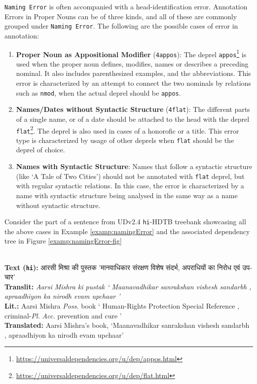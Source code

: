 \texttt{Naming Error} is often accompanied with a head-identification error. Annotation Errors in Proper Nouns can be of three kinds, and all of these are commonly grouped under \texttt{Naming Error}. The following are the possible cases of error in annotation:

\begin{enumerate}

    \item \textbf{Proper Noun as Appositional Modifier} (\texttt{4appos}): The deprel \texttt{appos}\footnote{\url{https://universaldependencies.org/u/dep/appos.html}} is used when the proper noun defines, modifies, names or describes a preceding nominal. It also includes parenthesized examples, and the abbreviations. This error is characterized by an attempt to connect the two nominals by relations such as \texttt{nmod}, when the actual deprel should be \texttt{appos}.
    
    \item \textbf{Names/Dates without Syntactic Structure} (\texttt{4flat}): The different parts of a single name, or of a date should be attached to the head with the deprel \texttt{flat}\footnote{\url{https://universaldependencies.org/u/dep/flat.html}}. The deprel is also used in cases of a honorofic or a title. This error type is characterized by usage of other deprels when \texttt{flat} should be the deprel of choice.

    \item \textbf{Names with Syntactic Structure}: Names that follow a syntactic structure (like `A Tale of Two Cities') should not be annotated with \texttt{flat} deprel, but with regular syntactic relations. In this case, the error is characterized by a name with syntactic structure being analysed in the same way as a name without syntactic structure.
    
\end{enumerate}

Consider the part of a sentence from UDv2.4 \texttt{hi}-HDTB treebank showcasing all the above cases in Example \ref{examp:namingError} and the associated dependency tree in Figure \ref{examp:namingError-fig}
\begin{example}
\label{examp:namingError}
\textbf{ }\\
\textbf{Text (\texttt{hi}):} \texthindi{आरसी मिश्रा की पुस्तक 'मानवाधिकार संरक्षण विशेष संदर्भ, अपराधियों का निरोध एवं उपचार'}\\
\textbf{Translit:} \textit{Aarsi Mishra ki pustak ` Maanavadhikar sanrakshan vishesh sandarbh , apraadhiyon ka nirodh evam upchaar '}\\
\textbf{Lit.:} Aarsi Mishra \textit{Poss.} book ` Human-Rights Protection Special Reference , criminal-\textit{Pl.} \textit{Acc.} prevention and cure '\\
\textbf{Translated:} Aarsi Mishra's book, `Maanavadhikar sanrakshan vishesh sandarbh , apraadhiyon ka nirodh evam upchaar'
\end{example}

